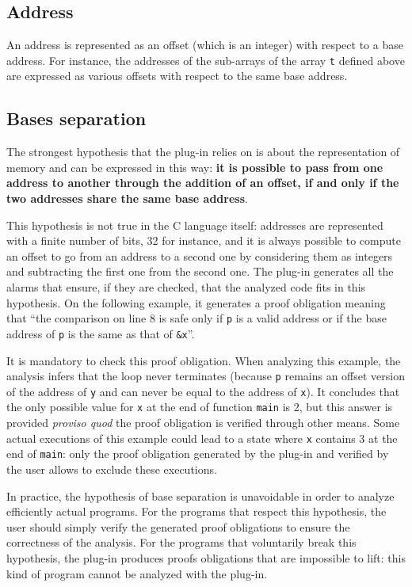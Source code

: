 \documentclass{frama-c-book}
\begin{document}
\subsection{Address}

An address is represented as an offset (which is an integer) with
respect to a base address. For instance, the addresses of the sub-arrays
of the array \lstinline|t| defined above are expressed as various offsets with
respect to the same base address.

\subsection{Bases separation}

The strongest hypothesis that the plug-in relies on is about the representation
of memory and can be expressed in this way:
{\bf it is possible to pass from one address to another through the addition
of an offset, if and only if the two addresses share the same base address}.
\medskip

This hypothesis is not true in the C language itself: addresses
are represented with a finite number of bits, 32 for instance,
and it is always possible to compute an offset to go from an address
to a second one by considering them as integers and subtracting the
first one from the second one.
The plug-in generates all the alarms that ensure, if they are checked,
that the analyzed code fits in this hypothesis. On the following example,
it generates a proof obligation meaning that ``the comparison
on line 8 is safe only if \lstinline|p| is a valid address or if the base address
of \lstinline|p| is the same as that of \lstinline|&x|''.

It is mandatory to check this proof obligation.  When analyzing this
example, the analysis infers that the loop never terminates (because
\lstinline|p| remains an offset version of the address of \lstinline|y| and can
never be equal to the address of \lstinline|x|).  It concludes that the
only possible value for \lstinline|x| at the end of function \lstinline|main| is
2, but this answer is provided {\em proviso quod} the proof obligation
is verified through other means. Some actual executions of this
example could lead to a state where \lstinline|x| contains 3 at the end of
\lstinline|main|: only the proof obligation generated by the plug-in and
verified by the user allows to exclude these executions.
\medskip

In practice, the hypothesis of base separation is unavoidable
in order to analyze efficiently actual programs. For the programs that
respect this hypothesis, the user should simply verify the generated
proof obligations to ensure the correctness of the analysis.
For the programs that voluntarily break this hypothesis,
the plug-in produces proofs obligations that are impossible to lift:
this kind of program cannot be analyzed with the \Eva{} plug-in.
\end{document}
